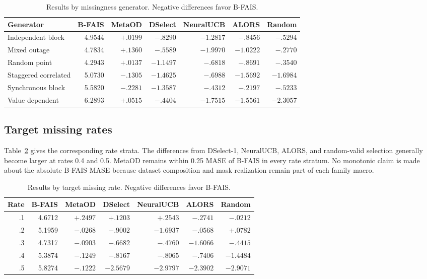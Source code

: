 \begin{table}[h]
\centering
\scriptsize
\setlength{\tabcolsep}{3.8pt}
\caption{Results by missingness generator. Negative differences favor B-FAIS.}
\label{tab:mechanism-results}
\begin{tabular}{lrrrrrr}
\toprule
Generator & B-FAIS & MetaOD & DSelect & NeuralUCB & ALORS & Random \\
\midrule
Independent block & 4.9544 & $+.0199$ & $-.8290$ & $-1.2817$ & $-.8456$ & $-.5294$ \\
Mixed outage & 4.7834 & $+.1360$ & $-.5589$ & $-1.9970$ & $-1.0222$ & $-.2770$ \\
Random point & 4.2943 & $+.0137$ & $-1.1497$ & $-.6818$ & $-.8691$ & $-.3540$ \\
Staggered correlated & 5.0730 & $-.1305$ & $-1.4625$ & $-.6988$ & $-1.5692$ & $-1.6984$ \\
Synchronous block & 5.5820 & $-.2281$ & $-1.3587$ & $-.4312$ & $-.2197$ & $-.5233$ \\
Value dependent & 6.2893 & $+.0515$ & $-.4404$ & $-1.7515$ & $-1.5561$ & $-2.3057$ \\
\bottomrule
\end{tabular}
\end{table}

\subsection{Target missing rates}

Table~\ref{tab:rate-results} gives the corresponding rate strata. The differences from DSelect-1, NeuralUCB, ALORS, and random-valid selection generally become larger at rates 0.4 and 0.5. MetaOD remains within 0.25 MASE of B-FAIS in every rate stratum. No monotonic claim is made about the absolute B-FAIS MASE because dataset composition and mask realization remain part of each family macro.

\begin{table}[h]
\centering
\scriptsize
\setlength{\tabcolsep}{4.2pt}
\caption{Results by target missing rate. Negative differences favor B-FAIS.}
\label{tab:rate-results}
\begin{tabular}{rrrrrrr}
\toprule
Rate & B-FAIS & MetaOD & DSelect & NeuralUCB & ALORS & Random \\
\midrule
.1 & 4.6712 & $+.2497$ & $+.1203$ & $+.2543$ & $-.2741$ & $-.0212$ \\
.2 & 5.1959 & $-.0268$ & $-.9002$ & $-1.6937$ & $-.0568$ & $+.0782$ \\
.3 & 4.7317 & $-.0903$ & $-.6682$ & $-.4760$ & $-1.6066$ & $-.4415$ \\
.4 & 5.3874 & $-.1249$ & $-.8167$ & $-.8065$ & $-.7406$ & $-1.4484$ \\
.5 & 5.8274 & $-.1222$ & $-2.5679$ & $-2.9797$ & $-2.3902$ & $-2.9071$ \\
\bottomrule
\end{tabular}
\end{table}

